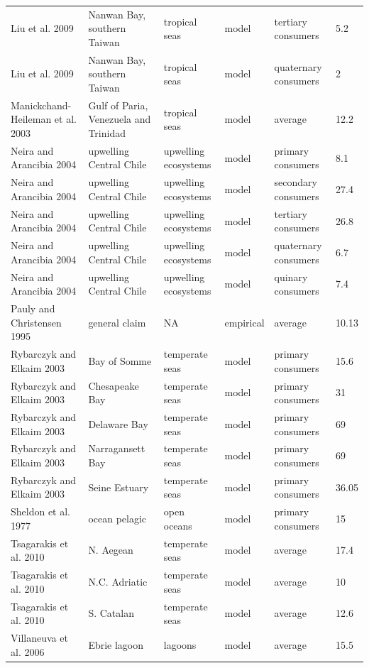 \documentclass[oneside,12pt,final]{sty/ucthesis-CA2012}
\begin{document}
\begin{mainmatter}
\begin{longtable} {p{4cm}p{3cm}p{2cm}lp{2cm}p{2cm}}
    Liu et al. 2009  & Nanwan Bay, southern Taiwan & tropical seas & model & tertiary consumers & 5.2 \\
    Liu et al. 2009   & Nanwan Bay, southern Taiwan & tropical seas & model & quaternary consumers & 2 \\
    Manickchand-Heileman et al. 2003   & Gulf of Paria, Venezuela and Trinidad & tropical seas & model & average & 12.2 \\
    Neira and Arancibia 2004   & upwelling Central Chile & upwelling ecosystems & model & primary consumers & 8.1 \\
    Neira and Arancibia 2004  & upwelling Central Chile & upwelling ecosystems & model & secondary consumers & 27.4 \\
    Neira and Arancibia 2004   & upwelling Central Chile & upwelling ecosystems & model & tertiary consumers & 26.8 \\
    Neira and Arancibia 2004   & upwelling Central Chile & upwelling ecosystems & model & quaternary consumers & 6.7 \\
    Neira and Arancibia 2004   & upwelling Central Chile & upwelling ecosystems & model & quinary consumers & 7.4 \\
    Pauly and Christensen 1995   & general claim & NA    & empirical & average & 10.13 \\
    Rybarczyk and Elkaim 2003   & Bay of Somme & temperate seas & model & primary consumers & 15.6 \\
    Rybarczyk and Elkaim 2003   & Chesapeake Bay & temperate seas & model & primary consumers & 31 \\
    Rybarczyk and Elkaim 2003  & Delaware Bay & temperate seas & model & primary consumers & 69 \\
    Rybarczyk and Elkaim 2003   & Narragansett Bay & temperate seas & model & primary consumers & 69 \\
    Rybarczyk and Elkaim 2003   & Seine Estuary & temperate seas & model & primary consumers & 36.05 \\
    Sheldon et al. 1977  &  ocean pelagic & open oceans & model & primary consumers & 15 \\
    Tsagarakis et al. 2010  & N. Aegean & temperate seas & model & average & 17.4 \\
    Tsagarakis et al. 2010  & N.C. Adriatic  & temperate seas & model & average & 10 \\
    Tsagarakis et al. 2010   & S. Catalan & temperate seas & model & average & 12.6 \\
    Villaneuva et al. 2006  & Ebrie lagoon  & lagoons & model & average & 15.5 \\

\end{longtable}
\end{mainmatter}
\end{document}
